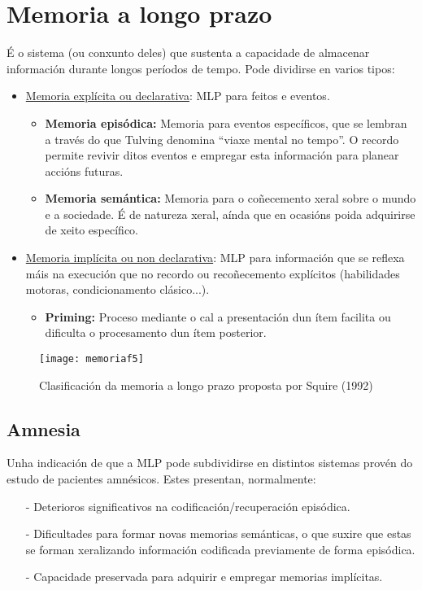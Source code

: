 \documentclass[a4paper,11pt]{article}
\begin{document}
\section{Memoria a longo prazo}
É o sistema (ou conxunto deles) que sustenta a capacidade de almacenar información durante longos períodos de tempo. Pode dividirse en varios tipos:
\begin{itemize}
	\item \underline{Memoria explícita ou declarativa}: MLP para feitos e eventos.
	\begin{itemize}
		\item \textbf{Memoria episódica:} Memoria para eventos específicos, que se lembran a través 			do que Tulving denomina ``viaxe mental no tempo''. O recordo permite revivir ditos eventos e 			empregar esta información para planear accións futuras.
		\item \textbf{Memoria semántica:} Memoria para o coñecemento xeral sobre o mundo e a 					sociedade. É de natureza xeral, aínda que en ocasións poida adquirirse de xeito específico. 
	\end{itemize}
	\item \underline{Memoria implícita ou non declarativa}: MLP para información que se reflexa máis 		na execución que no recordo ou recoñecemento explícitos (habilidades motoras, condicionamento 			clásico...).
	\begin{itemize}
		\item \textbf{Priming:} Proceso mediante o cal a presentación dun ítem facilita ou dificulta 			o procesamento dun ítem posterior.
	\end{itemize}
\end{itemize}

\begin{figure}[h!]
	\centering
	\texttt{[image: memoriaf5]}
	\caption{Clasificación da memoria a longo prazo proposta por Squire (1992)}
\end{figure}

\subsection{Amnesia}
Unha indicación de que a MLP pode subdividirse en distintos sistemas provén do estudo de pacientes amnésicos. Estes presentan, normalmente:
\begin{itemize}
	\item[-] Deterioros significativos na codificación/recuperación episódica.
	\item[-] Dificultades para formar novas memorias semánticas, o que suxire que estas se forman 			xeralizando información codificada previamente de forma episódica.
	\item[-] Capacidade preservada para adquirir e empregar memorias implícitas. 
\end{itemize}
\end{document}
